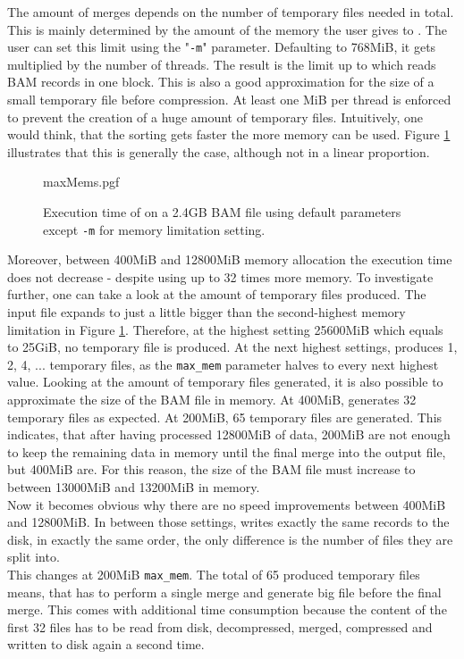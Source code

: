The amount of merges depends on the number of temporary files needed in total. This is mainly determined by the amount of the memory the user gives to \sort. The user can set this limit using the "\texttt{-m}" parameter. Defaulting to 768MiB, it gets multiplied by the number of threads. The result is the limit up to which \sort reads BAM records in one block. This is also a good approximation for the size of a small temporary file before compression. At least one MiB per thread is enforced to prevent the creation of a huge amount of temporary files. Intuitively, one would think, that the sorting gets faster the more memory can be used. Figure \ref{fig:maxMems} illustrates that this is generally the case, although not in a linear proportion.
\begin{figure}
        {maxMems.pgf}
    \caption{Execution time of \sort on a 2.4GB BAM file using default parameters except \texttt{-m} for memory limitation setting. }
    \label{fig:maxMems}
\end{figure}
Moreover, between 400MiB and 12800MiB memory allocation the execution time does not decrease - despite \sort using up to 32 times more memory. To investigate further, one can take a look at the amount of temporary files produced. The input file expands to just a little bigger than the second-highest memory limitation in Figure \ref{fig:maxMems}. Therefore, at the highest setting 25600MiB which equals to 25GiB, no temporary file is produced. At the next highest settings, \sort produces 1, 2, 4, ... temporary files, as the \texttt{max\_mem} parameter halves to every next highest value. Looking at the amount of temporary files generated, it is also possible to approximate the size of the BAM file in memory. At 400MiB, \sort generates 32 temporary files as expected. At 200MiB, 65 temporary files are generated. This indicates, that after having processed 12800MiB of data, 200MiB are not enough to keep the remaining data in memory until the final merge into the output file, but 400MiB are. For this reason, the size of the BAM file must increase to between 13000MiB and 13200MiB in memory. \\
Now it becomes obvious why there are no speed improvements between 400MiB and 12800MiB. In between those settings, \sort writes exactly the same records to the disk, in exactly the same order, the only difference is the number of files they are split into. \\
This changes at 200MiB \texttt{max\_mem}. The total of 65 produced temporary files means, that \sort has to perform a single merge and generate big file before the final merge. This comes with additional time consumption because the content of the first 32 files has to be read from disk, decompressed, merged, compressed  and written to disk again a second time. \\
